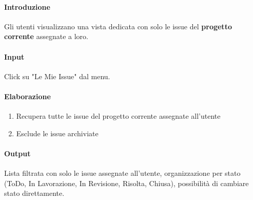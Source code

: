 \begin{reqbox}[title=REQ-FUN-17: Visualizza Issue Assegnate]
\label{subsubsec:req-visualizza-issue-assegnate}

\paragraph{Introduzione}
Gli utenti visualizzano una vista dedicata con solo le issue del \textbf{progetto corrente} assegnate a loro.

\paragraph{Input}
Click su "Le Mie Issue" dal menu.

\paragraph{Elaborazione}
\begin{enumerate}[leftmargin=1.1em]
\item Recupera tutte le issue del progetto corrente assegnate all'utente
\item Esclude le issue archiviate
\end{enumerate}

\paragraph{Output}
Lista filtrata con solo le issue assegnate all'utente, organizzazione per stato (ToDo, In Lavorazione, In Revisione, Risolta, Chiusa), possibilità di cambiare stato direttamente.

\end{reqbox}

\vspace{0.5cm}

\newpage


